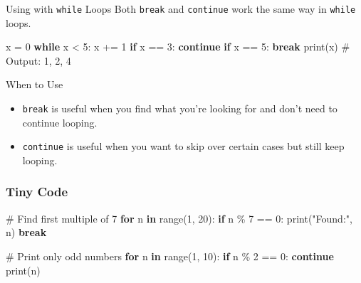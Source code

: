 \documentclass[
  letterpaper,
  DIV=11,
  numbers=noendperiod]{scrreprt}
\newenvironment{Shaded}{\begin{snugshade}}{\end{snugshade}}
\newcommand{\BuiltInTok}[1]{\textcolor[rgb]{0.00,0.23,0.31}{#1}}
\newcommand{\CommentTok}[1]{\textcolor[rgb]{0.37,0.37,0.37}{#1}}
\newcommand{\ControlFlowTok}[1]{\textcolor[rgb]{0.00,0.23,0.31}{\textbf{#1}}}
\newcommand{\DecValTok}[1]{\textcolor[rgb]{0.68,0.00,0.00}{#1}}
\newcommand{\KeywordTok}[1]{\textcolor[rgb]{0.00,0.23,0.31}{\textbf{#1}}}
\newcommand{\NormalTok}[1]{\textcolor[rgb]{0.00,0.23,0.31}{#1}}
\newcommand{\OperatorTok}[1]{\textcolor[rgb]{0.37,0.37,0.37}{#1}}
\newcommand{\StringTok}[1]{\textcolor[rgb]{0.13,0.47,0.30}{#1}}
\providecommand{\tightlist}{%
  \setlength{\itemsep}{0pt}\setlength{\parskip}{0pt}}
\begin{document}
Using with \texttt{while} Loops Both \texttt{break} and
\texttt{continue} work the same way in \texttt{while} loops.

\begin{Shaded}
\begin{Highlighting}[]
\NormalTok{x }\OperatorTok{=} \DecValTok{0}
\ControlFlowTok{while}\NormalTok{ x }\OperatorTok{\textless{}} \DecValTok{5}\NormalTok{:}
\NormalTok{    x }\OperatorTok{+=} \DecValTok{1}
    \ControlFlowTok{if}\NormalTok{ x }\OperatorTok{==} \DecValTok{3}\NormalTok{:}
        \ControlFlowTok{continue}
    \ControlFlowTok{if}\NormalTok{ x }\OperatorTok{==} \DecValTok{5}\NormalTok{:}
        \ControlFlowTok{break}
    \BuiltInTok{print}\NormalTok{(x)}
\CommentTok{\# Output: 1, 2, 4}
\end{Highlighting}
\end{Shaded}

When to Use

\begin{itemize}
\tightlist
\item
  \texttt{break} is useful when you find what you're looking for and
  don't need to continue looping.
\item
  \texttt{continue} is useful when you want to skip over certain cases
  but still keep looping.
\end{itemize}

\subsubsection{Tiny Code}\label{tiny-code-19}

\begin{Shaded}
\begin{Highlighting}[]
\CommentTok{\# Find first multiple of 7}
\ControlFlowTok{for}\NormalTok{ n }\KeywordTok{in} \BuiltInTok{range}\NormalTok{(}\DecValTok{1}\NormalTok{, }\DecValTok{20}\NormalTok{):}
    \ControlFlowTok{if}\NormalTok{ n }\OperatorTok{\%} \DecValTok{7} \OperatorTok{==} \DecValTok{0}\NormalTok{:}
        \BuiltInTok{print}\NormalTok{(}\StringTok{"Found:"}\NormalTok{, n)}
        \ControlFlowTok{break}

\CommentTok{\# Print only odd numbers}
\ControlFlowTok{for}\NormalTok{ n }\KeywordTok{in} \BuiltInTok{range}\NormalTok{(}\DecValTok{1}\NormalTok{, }\DecValTok{10}\NormalTok{):}
    \ControlFlowTok{if}\NormalTok{ n }\OperatorTok{\%} \DecValTok{2} \OperatorTok{==} \DecValTok{0}\NormalTok{:}
        \ControlFlowTok{continue}
    \BuiltInTok{print}\NormalTok{(n)}
\end{Highlighting}
\end{Shaded}
\end{document}
